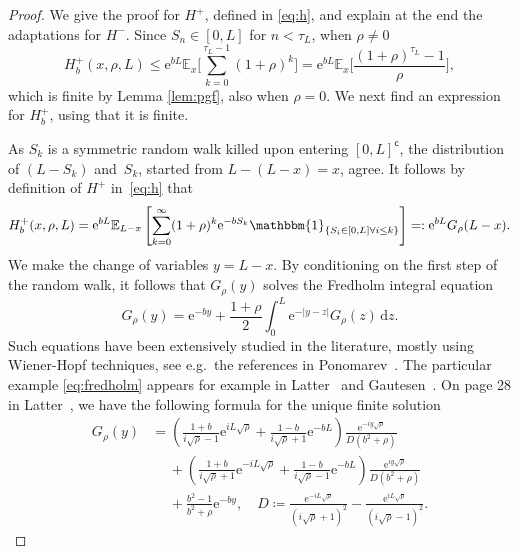 \documentclass[a4paper, a4wide, 10pt, reqno]{amsart}
\theoremstyle{plain}
\theoremstyle{definition}
\numberwithin{equation}{section}
\newcommand{\E}{\mathbb E}
\newcommand{\re}{{\mathrm e}}
\newcommand{\ind}[1]{\mathbbm{1}_{\{#1\}}}
\newcommand{\rd}{\mathrm{d}}
\renewcommand{\complement}{\mathsf{c}}
\begin{document}
\begin{proof}
We give the proof for $H^+$, defined in \eqref{eq:h}, and explain at the end the adaptations for $H^-$.
    Since $S_n\in[0,L]$ for $n<\tau_L$, when $\rho\neq0$
    \[
    H^+_b(x, \rho, L)\le \re^{bL}\E_x\Bigg[\sum_{k=0}^{\tau_L-1}(1+\rho)^k\Bigg]=\re^{bL}\E_x\Bigg[\frac{(1+\rho)^{\tau_L}-1}{\rho}\Bigg],
    \]
     which is finite by Lemma \ref{lem:pgf}, also when $\rho=0$.
    We next find an expression for $H^+_b$, using that it is finite.\smallskip

        As $S_k$ is a symmetric random walk killed upon entering $[0,L]^\complement$, the distribution of $(L-S_k)$ and~$S_k$, started from $L-(L-x)=x$, agree. It follows by definition of $H^+$ in~\eqref{eq:h} that 
        \begin{equation}\label{eq:b-snstar}
    H^+_{b}(x, \rho, L) = \re^{bL}\E_{L-x}\left[\sum_{k=0}^\infty (1+\rho)^k \re^{-bS_k}\ind{S_i\in[0,L] \forall i\le k}\right]=:\re^{bL}G_\rho(L-x).
        \end{equation}
        We make the change of variables $y=L-x$.
         By conditioning on the first step of the random walk, it follows that $G_\rho(y)$ solves the Fredholm integral equation
        \begin{equation}\label{eq:fredholm}
        G_\rho(y)=\re^{- by} + \frac{1+\rho}{2}\int_0^{ L}\re^{-|y-z|}G_\rho(z)\, \rd z.
        \end{equation}
        Such equations have been extensively studied in the literature, mostly using Wiener-Hopf techniques, see e.g.\ the references in Ponomarev~\cite{PonomarevAsymptoticSolution2021}. The particular example \eqref{eq:fredholm} appears for example in Latter~\cite{LatterApproximateSolutions1958} and Gautesen~\cite{GautesenClassFredholm1989}. On page 28 in Latter~\cite{LatterApproximateSolutions1958}, we have the following formula for the unique finite solution
        \begin{equation}\label{eq:fredholm-sol}
\begin{aligned}G_\rho(y) 
&= \left(\frac{1+ b}{i\sqrt{\rho}-1}\re^{i L\sqrt{\rho}} + \frac{1- b}{i\sqrt{\rho}+1}\re^{- b L}\right)\frac{\re^{-iy\sqrt{\rho}}}{D( b^2+\rho)}\\
&\hspace{15pt} +\left(\frac{1+ b}{i\sqrt{\rho}+1}\re^{-i L\sqrt{\rho}} + \frac{1- b}{i\sqrt{\rho}-1}\re^{- b L}\right)\frac{\re^{iy\sqrt{\rho}}}{D( b^2+\rho)}\\
&\hspace{15pt}+ \frac{ b^2-1}{ b^2+\rho}\re^{- by},\quad D \coloneqq \frac{\re^{-i L\sqrt{\rho}}}{(i\sqrt{\rho}+1)^2} - \frac{\re^{i L\sqrt{\rho}}}{(i\sqrt{\rho}-1)^2}.\end{aligned}

\end{equation}
\end{proof}
\end{document}
